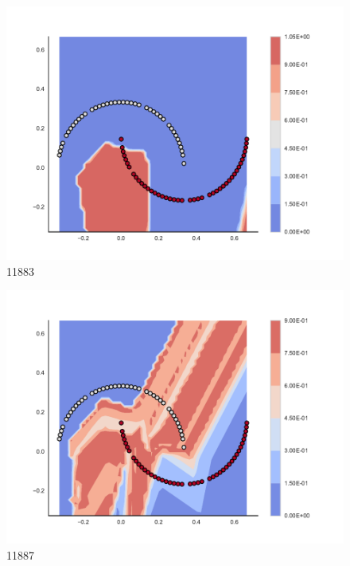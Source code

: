\begin{subfigure}[b]{0.09\textwidth}
    \includegraphics[clip, trim=2.35cm 1.75cm 4.5cm 0cm,width=\textwidth]{img/convergence/11883.pdf}
    \caption{11883}
    \label{fig:convergence_11883}
\end{subfigure}
%
\begin{subfigure}[b]{0.09\textwidth}
    \includegraphics[clip, trim=2.35cm 1.75cm 4.5cm 0cm,width=\textwidth]{img/convergence/11887.pdf}
    \caption{11887}
    \label{fig:convergence_11887}
\end{subfigure}
%
